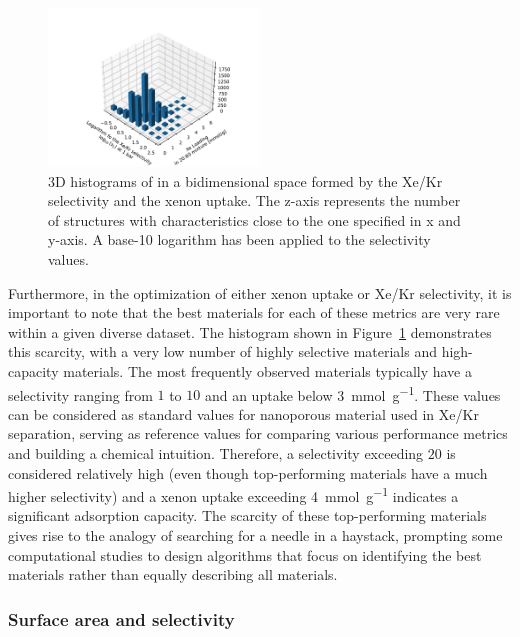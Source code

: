 \documentclass[main.tex]{subfiles}
\begin{document}
\begin{figure}[ht]
  \centering
  \includegraphics[width=0.5\textwidth,trim={2cm 0 2cm 2cm},clip]{figures/2-thermo/3D_hist_selec_uptake.pdf}
  \caption{3D histograms of in a bidimensional space formed by the Xe/Kr selectivity and the xenon uptake. The z-axis represents the number of structures with characteristics close to the one specified in x and y-axis. A base-10 logarithm has been applied to the selectivity values.}\label{fgr:3D_uptake}
\end{figure}

Furthermore, in the optimization of either xenon uptake or Xe/Kr selectivity, it is important to note that the best materials for each of these metrics are very rare within a given diverse dataset. The histogram shown in Figure~\ref{fgr:3D_uptake} demonstrates this scarcity, with a very low number of highly selective materials and high-capacity materials. The most frequently observed materials typically have a selectivity ranging from $1$ to $10$ and an uptake below \SI{3}{\milli\mole\per\gram}. These values can be considered as standard values for nanoporous material used in Xe/Kr separation, serving as reference values for comparing various performance metrics and building a chemical intuition. Therefore, a selectivity exceeding $20$ is considered relatively high (even though top-performing materials have a much higher selectivity\autocite{Pei_2022}) and a xenon uptake exceeding \SI{4}{\milli\mole\per\gram} indicates a significant adsorption capacity. The scarcity of these top-performing materials gives rise to the analogy of searching for a needle in a haystack, prompting some computational studies to design algorithms that focus on identifying the best materials rather than equally describing all materials.\autocite{Deshwal_2021,Glasby_2021} 

\subsubsection{Surface area and selectivity}
\end{document}

